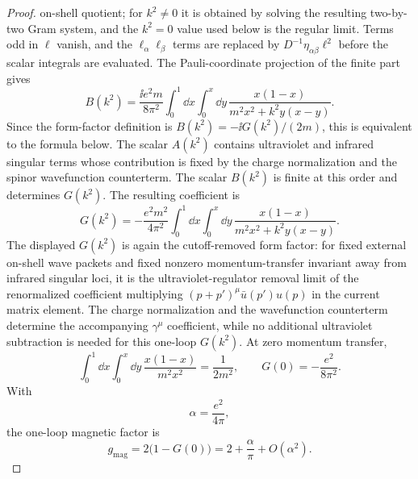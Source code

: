 \begin{proof}
on-shell quotient; for \(k^2\neq0\) it is obtained by solving the resulting
two-by-two Gram system, and the \(k^2=0\) value used below is the regular
limit.  Terms odd in \(\ell\) vanish, and the \(\ell_\alpha\ell_\beta\) terms
are replaced by \(D^{-1}\eta_{\alpha\beta}\ell^2\) before the scalar
integrals are evaluated.  The Pauli-coordinate projection of the finite part
gives
\[
  B(k^2)
  =
  \frac{\ii e^2m}{8\pi^2}
  \int_0^1\dd x\int_0^x\dd y\,
  \frac{x(1-x)}
       {m^2x^2+k^2y(x-y)} .
\]
Since the form-factor definition is
\(B(k^2)=-\ii G(k^2)/(2m)\), this is equivalent to the formula below.
The scalar \(A(k^2)\) contains ultraviolet and infrared singular terms whose
contribution is fixed by the charge normalization and the spinor
wavefunction counterterm.  The scalar \(B(k^2)\) is finite at this order and
determines \(G(k^2)\).  The resulting coefficient is
\[
  G(k^2)
  =
  -\frac{e^2m^2}{4\pi^2}
  \int_0^1\dd x\int_0^x\dd y\,
  \frac{x(1-x)}
       {m^2x^2+k^2y(x-y)} .
\]
The displayed \(G(k^2)\) is again the cutoff-removed form factor: for fixed
external on-shell wave packets and fixed nonzero momentum-transfer invariant
away from infrared singular loci, it is the ultraviolet-regulator removal
limit of the renormalized coefficient multiplying
\((p+p')^\mu\bar u(p')u(p)\) in the current matrix element.  The charge
normalization and the wavefunction counterterm determine the accompanying
\(\gamma^\mu\) coefficient, while no additional ultraviolet subtraction is
needed for this one-loop \(G(k^2)\).
At zero momentum transfer,
\[
  \int_0^1\dd x\int_0^x\dd y\,
  \frac{x(1-x)}{m^2x^2}
  =
  \frac1{2m^2},
  \qquad
  G(0)
  =
  -\frac{e^2}{8\pi^2}.
\]
With
\[
  \alpha=\frac{e^2}{4\pi},
\]
the one-loop magnetic factor is
\[
  g_{\mathrm{mag}}
  =
  2\bigl(1-G(0)\bigr)
  =
  2+\frac{\alpha}{\pi}+O(\alpha^2).
\]
\end{proof}

